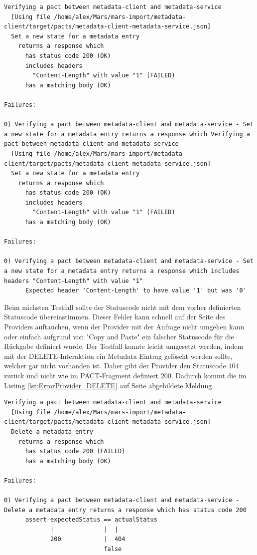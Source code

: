 \documentclass{llncs}
\begin{document}
\begin{lstlisting}[caption=Test,label={lst:ErrorProvider_PUT}]
Verifying a pact between metadata-client and metadata-service
  [Using file /home/alex/Mars/mars-import/metadata-client/target/pacts/metadata-client-metadata-service.json]
  Set a new state for a metadata entry
    returns a response which
      has status code 200 (OK)
      includes headers
        "Content-Length" with value "1" (FAILED)
      has a matching body (OK)

Failures:

0) Verifying a pact between metadata-client and metadata-service - Set a new state for a metadata entry returns a response which Verifying a pact between metadata-client and metadata-service
  [Using file /home/alex/Mars/mars-import/metadata-client/target/pacts/metadata-client-metadata-service.json]
  Set a new state for a metadata entry
    returns a response which
      has status code 200 (OK)
      includes headers
        "Content-Length" with value "1" (FAILED)
      has a matching body (OK)

Failures:

0) Verifying a pact between metadata-client and metadata-service - Set a new state for a metadata entry returns a response which includes headers "Content-Length" with value "1"
      Expected header 'Content-Length' to have value '1' but was '0'
\end{lstlisting}
      
Beim nächsten Testfall sollte der Statuscode nicht mit dem vorher definierten Statuscode übereinstimmen. Dieser Fehler kann schnell auf der Seite des Providers auftauchen, wenn der Provider mit der Anfrage nicht umgehen kann oder einfach aufgrund von "Copy and Paste" ein falscher Statuscode für die Rückgabe definiert wurde. Der Testfall konnte leicht umgesetzt werden, indem mit der DELETE-Interaktion ein Metadata-Eintrag gelöscht werden sollte, welcher gar nicht vorhanden ist. Daher gibt der Provider den Statuscode 404 zurück und nicht wie im PACT-Fragment definiert 200. Dadurch kommt die im Listing \ref{lst:ErrorProvider_DELETE} auf Seite \pageref{lst:ErrorProvider_DELETE} abgebildete Meldung.  

\begin{lstlisting}[caption=Test,label={lst:ErrorProvider_DELETE}]
Verifying a pact between metadata-client and metadata-service
  [Using file /home/alex/Mars/mars-import/metadata-client/target/pacts/metadata-client-metadata-service.json]
  Delete a metadata entry
    returns a response which
      has status code 200 (FAILED)
      has a matching body (OK)

Failures:

0) Verifying a pact between metadata-client and metadata-service - Delete a metadata entry returns a response which has status code 200
      assert expectedStatus == actualStatus
             |              |  |
             200            |  404
                            false
\end{lstlisting}
\end{document}
